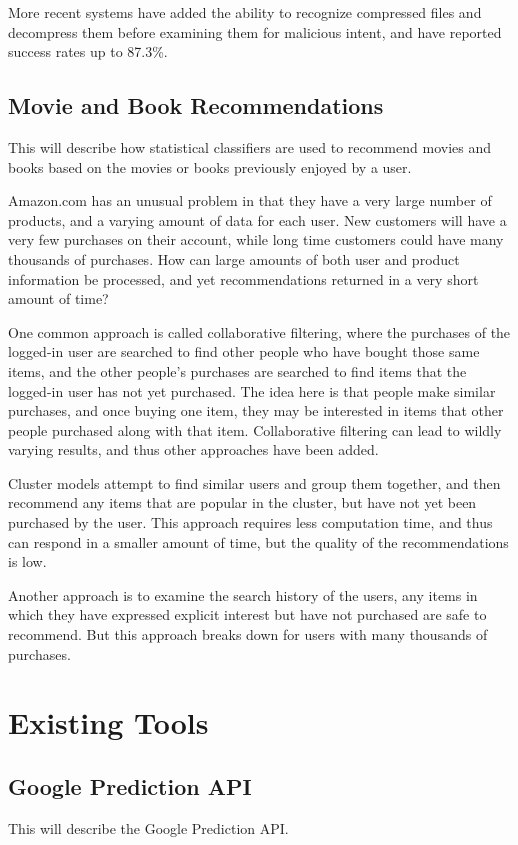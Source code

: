 \documentclass[12pt]{article}
\begin{document}
More recent systems have added the ability to recognize compressed files and decompress them before examining
them for malicious intent, and have reported success rates up to 87.3\%. \cite{perdisci2008mcboost}
\subsection{Movie and Book Recommendations}
This will describe how statistical classifiers are used to recommend movies \cite{basu1998recommendation} and
books \cite{linden2003amazon} based on the movies or books previously enjoyed by a user.

Amazon.com has an unusual problem in that they have a very large number of products, and a varying amount of
data for each user. New customers will have a very few purchases on their account, while long time customers
could have many thousands of purchases. How can large amounts of both user and product information be
processed, and yet recommendations returned in a very short amount of time?

One common approach is called collaborative filtering, where the purchases of the logged-in user are searched
to find other people who have bought those same items, and the other people's purchases are searched to find
items that the logged-in user has not yet purchased. The idea here is that people make similar purchases, and
once buying one item, they may be interested in items that other people purchased along with that item.
Collaborative filtering can lead to wildly varying results, and thus other approaches have been added.

Cluster models attempt to find similar users and group them together, and then recommend any items that are
popular in the cluster, but have not yet been purchased by the user. This approach requires less computation
time, and thus can respond in a smaller amount of time, but the quality of the recommendations is low.

Another approach is to examine the search history of the users, any items in which they have expressed
explicit interest but have not purchased are safe to recommend. But this approach breaks down for users with
many thousands of purchases.
\section{Existing Tools}
\subsection{Google Prediction API}
This will describe the Google Prediction API. \cite{GooglePrediction:2013:Online}
\end{document}

